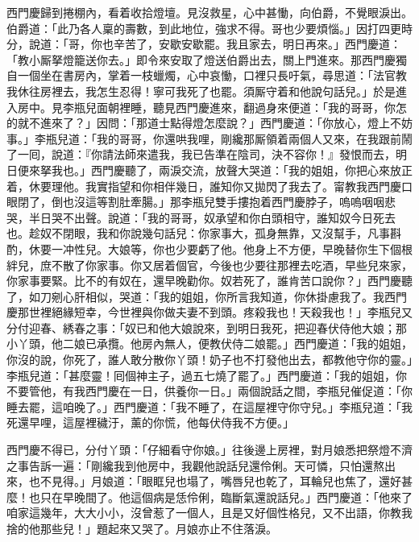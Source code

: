 西門慶歸到捲棚內，看着收拾燈壇。見沒救星，心中甚慟，向伯爵，不覺眼淚出。伯爵道：「此乃各人稟的壽數，到此地位，強求不得。哥也少要煩惱。」因打四更時分，說道：「哥，你也辛苦了，安歇安歇罷。我且家去，明日再來。」西門慶道：「教小厮拏燈籠送你去。」即令來安取了燈送伯爵出去，關上門進來。那西門慶獨自一個坐在書房內，掌着一枝蠟燭，心中哀慟，口裡只長吁氣，尋思道：「法官教我休往房裡去，我怎生忍得！寧可我死了也罷。須厮守着和他說句話兒。」{}於是進入房中。見李瓶兒面朝裡睡，聽見西門慶進來，翻過身來便道：「我的哥哥，你怎的就不進來了？」{}因問：「那道士點得燈怎麼說？」西門慶道：「你放心，燈上不妨事。」李瓶兒道：「我的哥哥，你還哄我哩，剛纔那厮領着兩個人又來，在我跟前鬧了一囘，說道：『你請法師來遣我，我已告準在陰司，決不容你！』發恨而去，明日便來拏我也。」西門慶聽了，兩淚交流，{}放聲大哭道：「我的姐姐，你把心來放正着，休要理他。我實指望和你相伴幾日，誰知你又拋閃了我去了。甯教我西門慶口眼閉了，倒也沒這等割肚牽腸。」那李瓶兒雙手摟抱着西門慶脖子，嗚嗚咽咽悲哭，半日哭不出聲。說道：「我的哥哥，奴承望和你白頭相守，誰知奴今日死去也。趁奴不閉眼，我和你說幾句話兒：你家事大，孤身無靠，又沒幫手，凡事斟酌，休要一冲性兒。大娘等，你也少要虧了他。{}他身上不方便，早晚替你生下個根絆兒，庶不散了你家事。你又居着個官，今後也少要往那裡去吃酒，早些兒來家，你家事要緊。比不的有奴在，還早晚勸你。奴若死了，誰肯苦口說你？」{}西門慶聽了，如刀剜心肝相似，哭道：「我的姐姐，你所言我知道，你休掛慮我了。我西門慶那世裡絕緣短幸，今世裡與你做夫妻不到頭。疼殺我也！天殺我也！」李瓶兒又分付迎春、綉春之事：「奴已和他大娘說來，到明日我死，把迎春伏侍他大娘；那小丫頭，他二娘已承攬。他房內無人，便教伏侍二娘罷。」西門慶道：「我的姐姐，你沒的說，你死了，誰人敢分散你丫頭！奶子也不打發他出去，都教他守你的靈。」李瓶兒道：「甚麼靈！囘個神主子，過五七燒了罷了。」西門慶道：「我的姐姐，你不要管他，有我西門慶在一日，供養你一日。」兩個說話之間，李瓶兒催促道：「你睡去罷，這咱晚了。」西門慶道：「我不睡了，在這屋裡守你守兒。」李瓶兒道：「我死還早哩，這屋裡穢汙，薰的你慌，他每伏侍我不方便。」

西門慶不得已，分付丫頭：「仔細看守你娘。」往後邊上房裡，對月娘悉把祭燈不濟之事告訴一遍：「剛纔我到他房中，我觀他說話兒還伶俐。天可憐，只怕還熬出來，也不見得。」{}月娘道：「眼眶兒也塌了，嘴唇兒也乾了，耳輪兒也焦了，還好甚麼！也只在早晚間了。他這個病是恁伶俐，臨斷氣還說話兒。」西門慶道：「他來了咱家這幾年，大大小小，沒曾惹了一個人，且是又好個性格兒，{}{}又不出語，你教我捨的他那些兒！」題起來又哭了。月娘亦止不住落淚。

